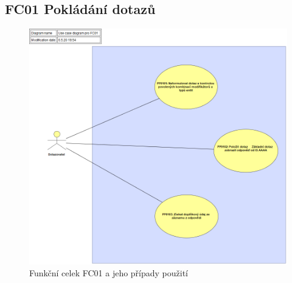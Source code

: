 \documentclass[thesis=M,czech]{FITthesis}[2019/12/23]
\begin{document}
\newpage
\subsection{FC01 Pokládání dotazů}
\label{FC01}
\begin{figure}[H]
  \centering
  \includegraphics[width=\textwidth]{res/design/Use case diagram pro FC01.png}
  \caption{Funkční celek FC01 a jeho případy použití}
  \label{fig:Funkční celek FC01 a jeho případy použití}
\end{figure}

\newpage
\end{document}
